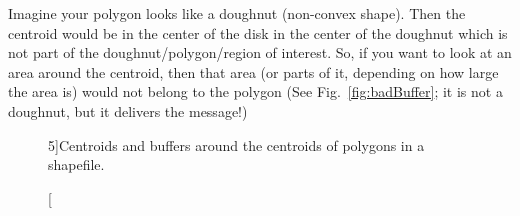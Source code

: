 {\color{red}{Warning:}} 
Imagine your polygon looks like a doughnut (non-convex shape).
Then the centroid would be in the center 
of the disk in the center
of the doughnut which is not part of the doughnut/polygon/region of interest.
So, if you want to look at an area around 
the centroid, then
that area (or parts of it, depending on how large the area is) 
would not belong to the polygon 
(See Fig.~\ref{fig:badBuffer}; it is not a doughnut, 
but it delivers the message!)
\begin{figure}
 \qquad
{}
\caption[][5\baselineskip]{Centroids and buffers around the centroids of 
         polygons in a shapefile.
\label{fig:badPolygon}}
\end{figure}

